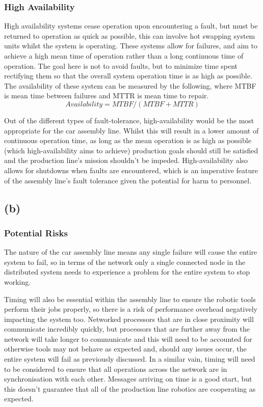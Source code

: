 \documentclass[]{report}
\begin{document}
				\subsubsection{High Availability}
				High availability systems cease operation upon encountering a fault, but must be returned to operation as quick as possible, this can involve hot swapping system units whilst the system is operating. These systems allow for failures, and aim to achieve a high mean time of operation rather than a long continuous time of operation. The goal here is not to avoid faults, but to minimize time spent rectifying them so that the overall system operation time is as high as possible\cite{gray1991high}. The availability of these system can be measured by the following, where MTBF is mean time between failures and MTTR is mean time to repair.
				\begin{equation*}
				Availability = MTBF/(MTBF + MTTR)
				\end{equation*}
				
				Out of the different types of fault-tolerance, high-availability would be the most appropriate for the car assembly line. Whilst this will result in a lower amount of continuous operation time, as long as the mean operation is as high as possible (which high-availability aims to achieve) production goals should still be satisfied and the production line's mission shouldn't be impeded. High-availability also allows for shutdowns when faults are encountered, which is an imperative feature of the assembly line's fault tolerance given the potential for harm to personnel.
			
			\subsection{(b)}
				\subsubsection{Potential Risks}
				The nature of the car assembly line means any single failure will cause the entire system to fail, so in terms of the network only a single connected node in the distributed system needs to experience a problem for the entire system to stop working. 
				
				Timing will also be essential within the assembly line to ensure the robotic tools perform their jobs properly, so there is a risk of performance overhead negatively impacting the system too. Networked processors that are in close proximity will communicate incredibly quickly, but processors that are further away from the network will take longer to communicate and this will need to be accounted for otherwise tools may not behave as expected and, should any issues occur, the entire system will fail as previously discussed. In a similar vain, timing will need to be considered to ensure that all operations across the network are in synchronisation with each other. Messages arriving on time is a good start, but this doesn't guarantee that all of the production line robotics are cooperating as expected.
				
\end{document}
